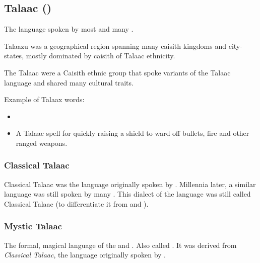 \subsection{Talaac (\Draconic)}
The language spoken by most \dragons and many \ophidians. 

Talaazu was a geographical region spanning many caisith kingdoms and city-states, mostly dominated by caisith of Talaac ethnicity. 

The Talaac were a Caisith ethnic group that spoke variants of the Talaac language and shared many cultural traits. 

Example of Talaax words: 

\begin{itemize}
    \item 
    \item 
        A Talaac spell for quickly raising a shield to ward off bullets, fire and other ranged weapons. 
\end{itemize}









\subsubsection{Classical Talaac}
Classical Talaac was the language originally spoken by .
Millennia later, a similar language was still spoken by many \ophidians. 
This  dialect of the language was still called Classical Talaac (to differentiate it from  and ).





\subsubsection{Mystic Talaac}
\index{\TrueDraconic}
The formal, magical language of the \dragons and \ophidians.
Also called \emph{\TrueDraconic}. 
It was derived from \emph{Classical Talaac}, the language originally spoken by . 

